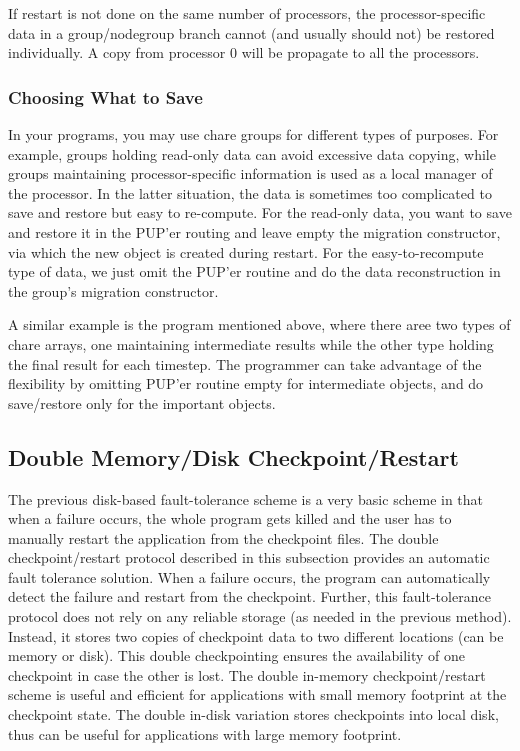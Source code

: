 If restart is not done on the same number of processors, the processor-specific
data in a group/nodegroup branch cannot (and usually should not) be 
restored individually. A copy from processor 0 will be propagate to all 
the processors.

\subsubsection{Choosing What to Save}
In your programs, you may use chare groups for different types of purposes. 
For example, groups holding read-only data can avoid excessive data copying,
while groups maintaining processor-specific information is used as a local
manager of the processor. In the latter situation, the data is sometimes
too complicated to save and restore but easy to re-compute. For the read-only
data, you want to save and restore it in the PUP'er routing and leave empty
the migration constructor, via which the new object is created during restart.
For the easy-to-recompute type of data, we just omit the PUP'er routine and
do the data reconstruction in the group's migration constructor.

A similar example is the program mentioned above, where there aree two 
types of chare arrays, one maintaining intermediate results while the 
other type holding the final result for each timestep. The programmer 
can take advantage of the flexibility by omitting PUP'er routine empty
for intermediate objects, and do save/restore only for the important 
objects. 

\subsection{Double Memory/Disk Checkpoint/Restart}
\label{sec:MemCheckpointing}

The previous disk-based fault-tolerance scheme is a very basic scheme in 
that when a failure occurs, the whole program gets killed and the user has to
manually restart the application from the checkpoint files.
The double checkpoint/restart protocol described in this subsection
provides an automatic fault tolerance solution. When a failure occurs,
the program can automatically detect the failure and restart from the 
checkpoint.
Further, this fault-tolerance protocol does not rely on any reliable
storage (as needed in the previous method). 
Instead, it stores two copies of checkpoint data to two different
locations (can be memory or disk).
This double checkpointing ensures the availability of one checkpoint in case
the other is lost. 
The double in-memory checkpoint/restart scheme is useful and efficient
for applications with small memory footprint at the checkpoint state. 
The double in-disk variation stores checkpoints into local disk, thus 
can be useful for applications with large memory footprint. 


